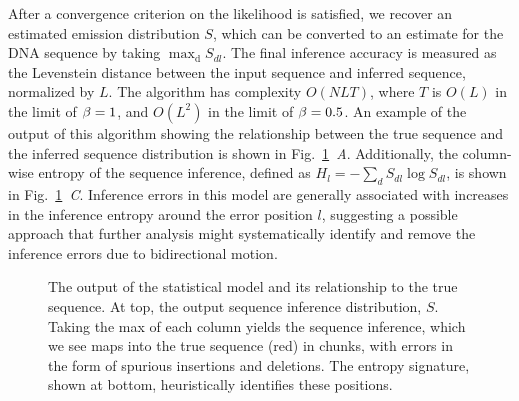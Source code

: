 \documentclass{biophys_letter}
\begin{document}
After a convergence criterion on the likelihood is satisfied, we recover an estimated emission distribution $S$, which can be converted to an estimate for the DNA sequence by taking $\mathrm{\max_{d}} {S_{dl}}$.
The final inference accuracy is measured as the Levenstein distance between the input sequence and inferred sequence, normalized by $L$.
The algorithm has complexity $O(NLT)$, where $T$ is $O(L)$ in the limit of $\beta=1$, and $O(L^2)$ in the limit of $\beta=0.5$.
An example of the output of this algorithm showing the relationship between the true sequence and the inferred sequence distribution is shown in Fig.~\ref{fig:inference_output}\emph{~A}.
Additionally, the column-wise entropy of the sequence inference, defined as $H_{l}=-\sum_{d}S_{dl}\log{S_{dl}}$, is shown in Fig.~\ref{fig:inference_output}\emph{~C}.
Inference errors in this model are generally associated with increases in the inference entropy around the error position $l$, suggesting a possible approach that further analysis might systematically identify and remove the inference errors due to bidirectional motion.

\begin{figure}
  \caption{The output of the statistical model and its relationship to the true sequence. At top, the output sequence inference distribution, $S$. Taking the max of each column yields the sequence inference, which we see maps into the true sequence (red) in chunks, with errors in the form of spurious insertions and deletions. The entropy signature, shown at bottom, heuristically identifies these positions.}
\label{fig:inference_output}
\end{figure}
\end{document}
